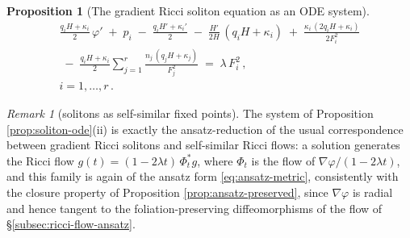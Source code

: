 \documentclass[11pt]{amsart}
\theoremstyle{plain}
\numberwithin{equation}{section}
\newtheorem{proposition}[theorem]{Proposition}
\theoremstyle{definition}
\theoremstyle{remark}
\newtheorem*{remarkx}{Remark}
\begin{document}
\begin{proposition}[The gradient Ricci soliton equation as an ODE system]
	\begin{equation*}
		\begin{gathered}
			\frac{q_i H + \kappa_i}{2}\, \varphi' \;+\; p_i \;-\; \frac{q_i H' + \kappa_i'}{2} \;-\; \frac{H'}{2H}\,(q_i H + \kappa_i) \;+\; \frac{\kappa_i\,(2 q_i H + \kappa_i)}{2 F_i^2} \\
			\;-\; \frac{q_i H + \kappa_i}{2} \sum_{j=1}^r \frac{n_j\,(q_j H + \kappa_j)}{F_j^2} \;=\; \lambda\, F_i^2 \,, \\
			i = 1, \dots, r \,.
		\end{gathered}
	\end{equation*}
	
\end{proposition}



\begin{remarkx}[solitons as self-similar fixed points]
	The system of Proposition \ref{prop:soliton-ode}(ii) is exactly the ansatz-reduction of the usual correspondence between gradient Ricci solitons and self-similar Ricci flows: a solution generates the Ricci flow $g(t) = (1 - 2\lambda t)\, \Phi_t^* g$, where $\Phi_t$ is the flow of $\nabla \varphi / (1 - 2\lambda t)$, and this family is again of the ansatz form \eqref{eq:ansatz-metric}, consistently with the closure property of Proposition \ref{prop:ansatz-preserved}, since $\nabla \varphi$ is radial and hence tangent to the foliation-preserving diffeomorphisms of the flow of \S\ref{subsec:ricci-flow-ansatz}.
	
\end{remarkx}
\end{document}

